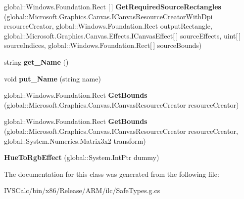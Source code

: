 \begin{DoxyCompactItemize}
\item 
\mbox{\label{class_microsoft_1_1_graphics_1_1_canvas_1_1_effects_1_1_hue_to_rgb_effect_aed6c2ae7965484b3c0b70df8d9044dde}} 
global\+::\+Windows.\+Foundation.\+Rect \mbox{[}$\,$\mbox{]} {\bfseries Get\+Required\+Source\+Rectangles} (global\+::\+Microsoft.\+Graphics.\+Canvas.\+I\+Canvas\+Resource\+Creator\+With\+Dpi resource\+Creator, global\+::\+Windows.\+Foundation.\+Rect output\+Rectangle, global\+::\+Microsoft.\+Graphics.\+Canvas.\+Effects.\+I\+Canvas\+Effect\mbox{[}$\,$\mbox{]} source\+Effects, uint\mbox{[}$\,$\mbox{]} source\+Indices, global\+::\+Windows.\+Foundation.\+Rect\mbox{[}$\,$\mbox{]} source\+Bounds)
\item 
\mbox{\label{class_microsoft_1_1_graphics_1_1_canvas_1_1_effects_1_1_hue_to_rgb_effect_acaf23d596e4ca63af24fc5479e5ce357}} 
string {\bfseries get\+\_\+\+Name} ()
\item 
\mbox{\label{class_microsoft_1_1_graphics_1_1_canvas_1_1_effects_1_1_hue_to_rgb_effect_ad5caefc30bda17bfdc0502bc47a121cd}} 
void {\bfseries put\+\_\+\+Name} (string name)
\item 
\mbox{\label{class_microsoft_1_1_graphics_1_1_canvas_1_1_effects_1_1_hue_to_rgb_effect_ab774b7f3ac6d0173e3b471e2a62a5f1c}} 
global\+::\+Windows.\+Foundation.\+Rect {\bfseries Get\+Bounds} (global\+::\+Microsoft.\+Graphics.\+Canvas.\+I\+Canvas\+Resource\+Creator resource\+Creator)
\item 
\mbox{\label{class_microsoft_1_1_graphics_1_1_canvas_1_1_effects_1_1_hue_to_rgb_effect_ae81dbf6d3c670a1891c8c1eabc187d56}} 
global\+::\+Windows.\+Foundation.\+Rect {\bfseries Get\+Bounds} (global\+::\+Microsoft.\+Graphics.\+Canvas.\+I\+Canvas\+Resource\+Creator resource\+Creator, global\+::\+System.\+Numerics.\+Matrix3x2 transform)
\item 
\mbox{\label{class_microsoft_1_1_graphics_1_1_canvas_1_1_effects_1_1_hue_to_rgb_effect_ad16bfb8aa25ec27ae445cf655105dbee}} 
{\bfseries Hue\+To\+Rgb\+Effect} (global\+::\+System.\+Int\+Ptr dummy)
\end{DoxyCompactItemize}


The documentation for this class was generated from the following file\+:\begin{DoxyCompactItemize}
\item 
I\+V\+S\+Calc/bin/x86/\+Release/\+A\+R\+M/ilc/Safe\+Types.\+g.\+cs\end{DoxyCompactItemize}
